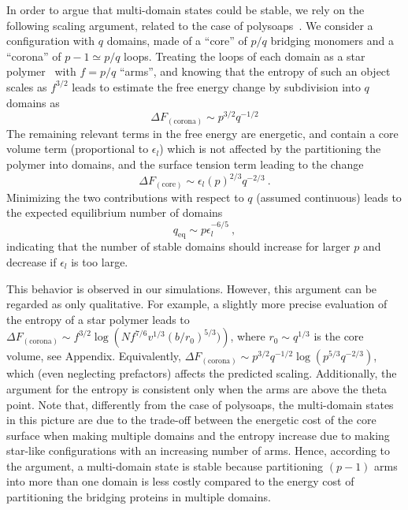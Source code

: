 \documentclass[
preprint,
a4paper,
12pt,
superscriptaddress,
pre]{revtex4}
\begin{document}
In order to argue that multi-domain states could be stable, we rely on
the following scaling argument, related to the case of
polysoaps~\citep{Borisov1997,Borisov1996}. We consider a configuration
with $q$ domains, made of a ``core'' of $p/q$ bridging monomers and a
``corona'' of $p-1\simeq p/q$ loops.  Treating the loops of each
domain as a star polymer~\cite{Borisov1997} with $f=p/q$ ``arms'', and
knowing that the entropy of such an object scales as
$f^{3/2}$\cite{Daoud1982} leads to estimate the free energy change by
subdivision into $q$ domains as
\begin{equation}
  \Delta F_\mathrm{(corona)} \sim p^{3/2}q^{-1/2}
 \label{eq:poly1}
\end{equation}
The remaining relevant terms in the free energy are energetic, and
contain a core volume term (proportional to $\epsilon_l$) which is not
affected by the partitioning the polymer into domains, and the surface
tension term leading to the change
\begin{equation}
  \Delta F_\mathrm{(core)} \sim \epsilon_l (p)^{2/3}q^{-2/3} \ .
 \label{eq:poly2}
\end{equation}
Minimizing the two contributions with respect to $q$ (assumed
continuous) leads to the expected equilibrium number of domains 
\begin{equation}
  q_{\mathrm{eq}} \sim p  \epsilon_l^{-6/5} \ ,
\end{equation}
indicating that the number of stable domains should increase for
larger $p$ and decrease if $\epsilon_l$ is too large. 


This  behavior is observed in our simulations.  However, this
argument can be regarded as only qualitative. For example, a slightly
more precise evaluation of the entropy of a star polymer leads to $
\Delta F_\mathrm{(corona)} \sim f^{3/2} \log\left(Nf^{7/6} v^{1/3} (b
/ r_0)^{5/3}) \right)$, where $r_0 \sim q^{1/3}$
is the core volume, see Appendix. Equivalently, $ \Delta
F_\mathrm{(corona)} \sim p^{3/2}q^{-1/2} \log\left( p^{5/3}q^{-2/3}
\right)$, which (even neglecting prefactors) affects the predicted
scaling. Additionally, the argument for the entropy is consistent only
when the arms are above the theta point.
Note that, differently from the case of polysoaps, the multi-domain
states in this picture are due to the trade-off between the energetic
cost of the core surface when making multiple domains and the entropy
increase due to making star-like configurations with an increasing
number of arms.  Hence, according to the argument, a multi-domain
state is stable because partitioning $(p-1)$ arms into more than one
domain is less costly compared to the energy cost of partitioning the
bridging proteins in multiple domains.
  
\end{document}
